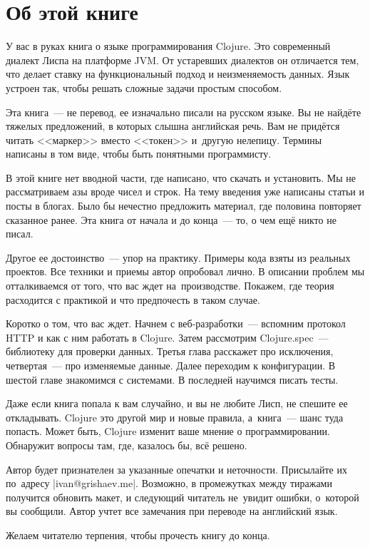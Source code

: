 \chapter*{Об этой книге}

У вас в руках книга о языке программирования Clojure. Это современный диалект
Лиспа на платформе JVM. От устаревших диалектов он отличается тем, что делает
ставку на функциональный подход и неизменяемость данных. Язык устроен так, чтобы
решать сложные задачи простым способом.

Эта книга~--- не перевод, ее изначально писали на русском языке. Вы не найд\"{е}те
тяжелых предложений, в которых слышна английская речь. Вам не прид\"{е}тся читать
<<маркер>> вместо <<токен>> и~другую нелепицу. Термины написаны в том виде,
чтобы быть понятными программисту.

В этой книге нет вводной части, где написано, что скачать и установить. Мы не
рассматриваем азы вроде чисел и строк. На тему введения уже написаны статьи и
посты в блогах. Было бы нечестно предложить материал, где половина повторяет
сказанное ранее. Эта книга от начала и до конца~--- то, о чем ещ\"{е} никто не
писал.

Другое ее достоинство~--- упор на практику. Примеры кода взяты из реальных
проектов. Все техники и приемы автор опробовал лично. В описании проблем мы
отталкиваемся от того, что вас ждет на~производстве. Покажем, где теория
расходится с практикой и что предпочесть в таком случае.

Коротко о том, что вас ждет. Начнем с веб-разработки~--- вспомним протокол HTTP
и как с ним работать в Clojure. Затем рассмотрим Clojure.spec~--- библиотеку для
проверки данных. Третья глава расскажет про исключения, четвертая~--- про
изменяемые данные. Далее переходим к конфигурации. В шестой главе знакомимся с
системами. В последней научимся писать тесты.

Даже если книга попала к вам случайно, и вы не любите Лисп, не спешите ее
откладывать. Clojure это другой мир и новые правила, а~книга~--- шанс туда
попасть. Может быть, Clojure изменит ваше мнение о программировании. Обнаружит
вопросы там, где, казалось бы, вс\"{е} решено.

Автор будет признателен за указанные опечатки и неточности. Присылайте их
по~адресу \spverb|ivan@grishaev.me|. Возможно, в промежутках между тиражами
получится обновить макет, и следующий читатель не~увидит ошибки, о~которой вы
сообщили. Автор учтет все замечания при переводе на английский язык.

Желаем читателю терпения, чтобы прочесть книгу до конца.

